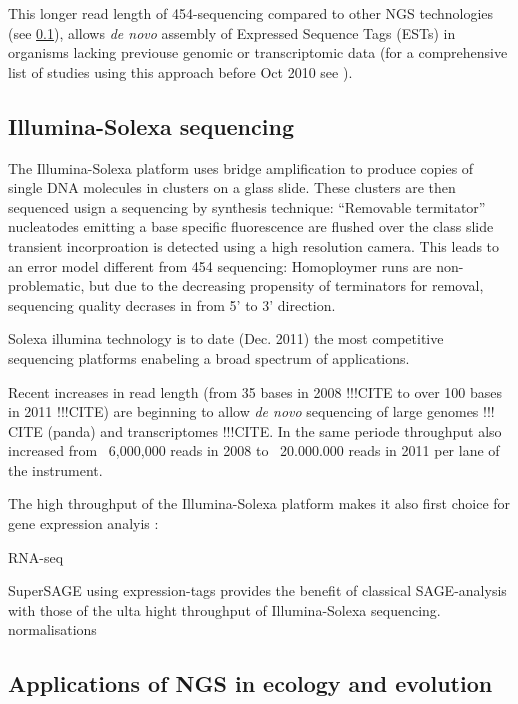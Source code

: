 This longer read length of 454-sequencing \cite{pmid16056220} compared
to other NGS technologies (see \ref{sec:ill-seq}), allows \textit{de
  novo} assembly of Expressed Sequence Tags (ESTs) in organisms
lacking previouse genomic or transcriptomic data (for a comprehensive
list of studies using this approach before Oct 2010 see
\cite{pmid20950480}).

\subsection{Illumina-Solexa sequencing}
\label{sec:ill-seq}

The Illumina-Solexa platform uses bridge amplification to produce
copies of single DNA molecules in clusters on a glass slide. These
clusters are then sequenced usign a sequencing by synthesis technique:
``Removable termitator'' nucleatodes emitting a base specific
fluorescence are flushed over the class slide transient incorproation
is detected using a high resolution camera. This leads to an error
model different from 454 sequencing: Homoploymer runs are
non-problematic, but due to the decreasing propensity of terminators
for removal, sequencing quality decrases in from 5' to 3' direction.

Solexa illumina technology is to date (Dec. 2011) the most competitive
sequencing platforms enabeling a broad spectrum of applications.

Recent increases in read length (from 35 bases in 2008 !!!CITE to over
100 bases in 2011 !!!CITE) are beginning to allow \textit{de novo}
sequencing of large genomes !!! CITE (panda) and transcriptomes
!!!CITE. In the same periode throughput also increased from ~6,000,000
reads in 2008 to ~20.000.000 reads in 2011 per lane of the instrument.

The high throughput of the Illumina-Solexa platform makes it also
first choice for gene expression analyis \cite{pmid21627854}:

RNA-seq \cite{pmid19015660} 

SuperSAGE \cite{pmid20967605} using expression-tags provides the
benefit of classical SAGE-analysis \cite{pmid7570003} with those of
the ulta hight throughput of Illumina-Solexa
sequencing. normalisations

\subsection{Applications of NGS in ecology and evolution}
\label{sec:appl-ngs}

